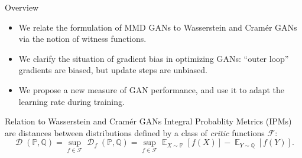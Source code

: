 \documentclass[xcolor={table}]{beamer}
\DeclareMathOperator{\D}{\mathcal{D}}
\DeclareMathOperator*{\E}{\mathbb{E}}
\newcommand{\F}{\mathcal{F}}
\newcommand{\PP}{\mathbb P}
\newcommand{\QQ}{\mathbb Q}
\begin{document}
\begin{frame}{}
\maketitle
\begin{columns}[T, totalwidth=\textwidth]

  \begin{column}{.32\textwidth}
    \begin{block}{Overview}
      \begin{itemize}
        \item We relate the formulation of MMD GANs to Wasserstein and Cram\'er GANs
              via the notion of witness functions.
        \item We clarify the situation of gradient bias in optimizing GANs:
              ``outer loop'' gradients are biased, but update steps are unbiased.
        \item We propose a new measure of GAN performance, %
              and use it to adapt the learning rate during training.
      \end{itemize}
    \end{block}
    \begin{block}{Relation to Wasserstein and Cram\'er GANs} 
      Integral Probablity Metrics (IPMs) %
      are distances between distributions
      defined by a class of \emph{critic} functions $\F$:
      \[
        \D(\PP, \QQ)
        = \sup_{f \in \F} \D_f(\PP, \QQ)
        = \sup_{f\in\F} \E_{X\sim\PP}[f(X)] - \E_{Y\sim\QQ}[f(Y)].
      \]


\end{block}
\end{column}
\end{columns}
\end{frame}
\end{document}
